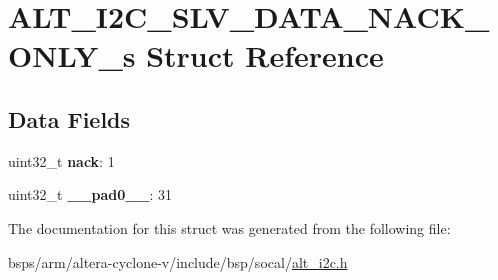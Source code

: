 \hypertarget{structALT__I2C__SLV__DATA__NACK__ONLY__s}{}\section{A\+L\+T\+\_\+\+I2\+C\+\_\+\+S\+L\+V\+\_\+\+D\+A\+T\+A\+\_\+\+N\+A\+C\+K\+\_\+\+O\+N\+L\+Y\+\_\+s Struct Reference}
\label{structALT__I2C__SLV__DATA__NACK__ONLY__s}
\subsection*{Data Fields}
\begin{DoxyCompactItemize}
\item 
\mbox{\label{structALT__I2C__SLV__DATA__NACK__ONLY__s_ae1c68453af41596ec80dd9250923c84c}} 
uint32\+\_\+t {\bfseries nack}\+: 1
\item 
\mbox{\label{structALT__I2C__SLV__DATA__NACK__ONLY__s_a2d3db9b78ae8c2c6e210b0d9adaa8e7e}} 
uint32\+\_\+t {\bfseries \+\_\+\+\_\+pad0\+\_\+\+\_\+}\+: 31
\end{DoxyCompactItemize}


The documentation for this struct was generated from the following file\+:\begin{DoxyCompactItemize}
\item 
bsps/arm/altera-\/cyclone-\/v/include/bsp/socal/\mbox{\hyperlink{socal_2alt__i2c_8h}{alt\+\_\+i2c.\+h}}\end{DoxyCompactItemize}
